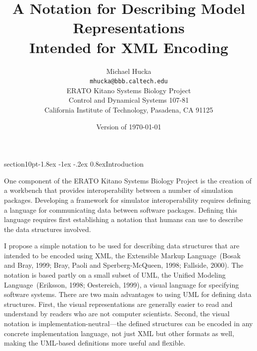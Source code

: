 \documentclass[10pt]{article}
\makeatletter
\renewcommand{\section}{\@startsection%
  {section}{1}{0pt}{-1.8ex \@plus -1ex \@minus -.2ex}%
  {0.8ex}{\normalfont\Large\bfseries}}
\makeatother
\begin{document}

\title{\textbf{A Notation for Describing Model Representations\\
Intended for XML Encoding}}

\author{Michael Hucka\\[2pt]
\normalsize\texttt{mhucka@bbb.caltech.edu}\\[-2pt]
\normalsize ERATO Kitano Systems Biology Project\\[-2pt]
\normalsize Control and Dynamical Systems 107-81\\[-2pt]
\normalsize California Institute of Technology, Pasadena, CA 91125}

\date{Version of \today{}}

\maketitle

\section{Introduction} 
\label{sec:introduction}


One component of the ERATO Kitano Systems Biology Project is the creation
of a workbench that provides interoperability between a number of
simulation packages.  Developing a framework for simulator interoperability
requires defining a language for communicating data between software
packages.  Defining this language requires first establishing a notation
that humans can use to describe the data structures involved.

I propose a simple notation to be used for describing data structures that
are intended to be encoded using XML, the Extensible Markup Language~(Bosak
and Bray, 1999; Bray, Paoli and Sperberg-McQueen, 1998; Fallside, 2000).
The notation is based partly on a small subset of UML, the Unified Modeling
Language~(Eriksson, 1998; Oestereich, 1999), a visual language for
specifying software systems.  There are two main advantages to using UML
for defining data structures.  First, the visual representations are
generally easier to read and understand by readers who are not computer
scientists.  Second, the visual notation is implementation-neutral---the
defined structures can be encoded in any concrete implementation language,
not just XML but other formats as well, making the UML-based definitions
more useful and flexible.
\end{document}
